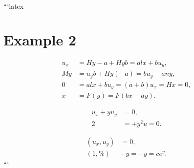 ```latex
\section*{Example 2}

\begin{align}
    u_x &= Hy - a + Hyb = a l x + b u_y, \\
    My &= u_y b + Hy(-a) = b u_y - a n y, \\
    0 &= a l x + b u_y = (a + b) u_x = Hx = 0, \\
    x &= F(y) = F(bx - ay).
\end{align}

\begin{align}
    u_x + y u_y &= 0, \\
    2 &= + y^2 u = 0.
\end{align}

\begin{align}
    (u_x, u_y) &= 0, \\
    (1, \%) &- y = + y = c e^y.
\end{align}
```
